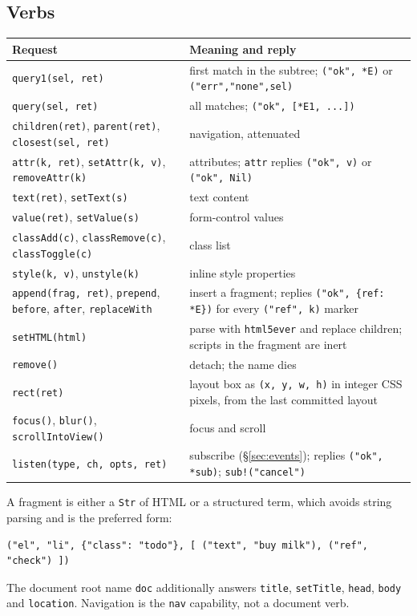\documentclass[11pt]{article}
\theoremstyle{definition}
\theoremstyle{remark}
\newcommand{\code}[1]{\texttt{#1}}
\begin{document}
\subsection{Verbs}
\begin{center}\small
\begin{tabularx}{\linewidth}{@{}p{4.4cm}X@{}}
\toprule
Request & Meaning and reply\\
\midrule
\code{query1(sel, ret)} & first match in the subtree; \code{("ok", *E)} or \code{("err","none",sel)}\\
\code{query(sel, ret)} & all matches; \code{("ok", [*E1, ...])}\\
\code{children(ret)}, \code{parent(ret)}, \code{closest(sel, ret)} & navigation, attenuated\\
\code{attr(k, ret)}, \code{setAttr(k, v)}, \code{removeAttr(k)} & attributes; \code{attr} replies \code{("ok", v)} or \code{("ok", Nil)}\\
\code{text(ret)}, \code{setText(s)} & text content\\
\code{value(ret)}, \code{setValue(s)} & form-control values\\
\code{classAdd(c)}, \code{classRemove(c)}, \code{classToggle(c)} & class list\\
\code{style(k, v)}, \code{unstyle(k)} & inline style properties\\
\code{append(frag, ret)}, \code{prepend}, \code{before}, \code{after}, \code{replaceWith} & insert a fragment; replies \code{("ok", \{ref: *E\})} for every \code{("ref", k)} marker\\
\code{setHTML(html)} & parse with \code{html5ever} and replace children; scripts in the fragment are inert\\
\code{remove()} & detach; the name dies\\
\code{rect(ret)} & layout box as \code{(x, y, w, h)} in integer CSS pixels, from the last committed layout\\
\code{focus()}, \code{blur()}, \code{scrollIntoView()} & focus and scroll\\
\code{listen(type, ch, opts, ret)} & subscribe (\S\ref{sec:events}); replies \code{("ok", *sub)}; \code{sub!("cancel")}\\
\bottomrule
\end{tabularx}
\end{center}

\noindent
A fragment is either a \code{Str} of HTML or a structured term, which avoids
string parsing and is the preferred form:
\begin{lstlisting}
("el", "li", {"class": "todo"}, [ ("text", "buy milk"), ("ref", "check") ])
\end{lstlisting}
The document root name \code{doc} additionally answers \code{title}, \code{setTitle},
\code{head}, \code{body} and \code{location}. Navigation is the \code{nav}
capability, not a document verb.
\end{document}
